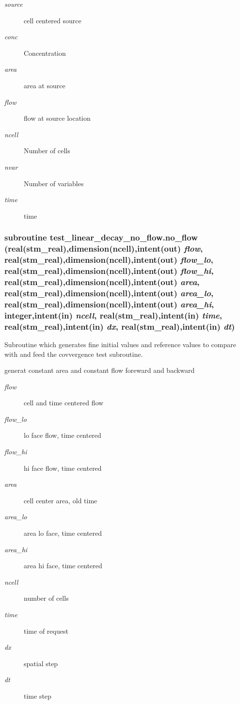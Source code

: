 \begin{Desc}
\item[Parameters:]
\begin{description}
\item[{\em source}]cell centered source \item[{\em conc}]Concentration\item[{\em area}]area at source \item[{\em flow}]flow at source location\item[{\em ncell}]Number of cells\item[{\em nvar}]Number of variables\item[{\em time}]time \end{description}
\end{Desc}
\hypertarget{a00089_fc187de07f4af8d9e1e862973572b504}{
\subsubsection[{no\_\-flow}]{\setlength{\rightskip}{0pt plus 5cm}subroutine test\_\-linear\_\-decay\_\-no\_\-flow.no\_\-flow (real(stm\_\-real),dimension(ncell),intent(out) {\em flow}, \/  real(stm\_\-real),dimension(ncell),intent(out) {\em flow\_\-lo}, \/  real(stm\_\-real),dimension(ncell),intent(out) {\em flow\_\-hi}, \/  real(stm\_\-real),dimension(ncell),intent(out) {\em area}, \/  real(stm\_\-real),dimension(ncell),intent(out) {\em area\_\-lo}, \/  real(stm\_\-real),dimension(ncell),intent(out) {\em area\_\-hi}, \/  integer,intent(in) {\em ncell}, \/  real(stm\_\-real),intent(in) {\em time}, \/  real(stm\_\-real),intent(in) {\em dx}, \/  real(stm\_\-real),intent(in) {\em dt})}}
\label{a00089_fc187de07f4af8d9e1e862973572b504}


Subroutine which generates fine initial values and reference values to compare with and feed the covvergence test subroutine. 

generat constant area and constant flow foreward and backward \begin{Desc}
\item[Parameters:]
\begin{description}
\item[{\em flow}]cell and time centered flow\item[{\em flow\_\-lo}]lo face flow, time centered\item[{\em flow\_\-hi}]hi face flow, time centered\item[{\em area}]cell center area, old time\item[{\em area\_\-lo}]area lo face, time centered\item[{\em area\_\-hi}]area hi face, time centered\item[{\em ncell}]number of cells\item[{\em time}]time of request\item[{\em dx}]spatial step\item[{\em dt}]time step \end{description}
\end{Desc}
